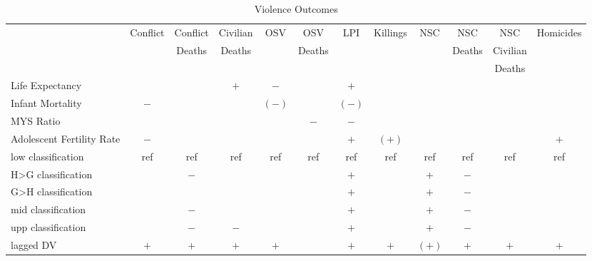 \begin{landscape}
\begin{table}[!htbp]
\centering
\caption{Violence Outcomes}
\label{table_violence}
\begin{tabular}{lccccccccccc}
\toprule
                          & Conflict       & Conflict & Civilian & OSV    & OSV    & LPI    & Killings & NSC      & NSC      & NSC      & Homicides \\
                          &                & Deaths   & Deaths   &        & Deaths &        &          &          & Deaths   & Civilian & \\
                          &                &          &          &        &        &        &          &          &          & Deaths   & \\
\midrule
Life Expectancy           &                &          & $+$      & $-$    &        & $+$    &          &          &          &          & \\
Infant Mortality          & $-$            &          &          & $(-)$  &        & $(-)$  &          &          &          &          & \\
MYS Ratio                 &                &          &          &        & $-$    & $-$    &          &          &          &          & \\
Adolescent Fertility Rate & $-$            &          &          &        &        & $+$    & $(+)$    &          &          &          & $+$ \\
low classification        & ref            & ref      & ref      & ref    & ref    & ref    & ref      & ref      & ref      & ref      & ref \\
H>G classification        &                & $-$      &          &        &        & $+$    &          & $+$      & $-$      &          & \\
G>H classification        &                &          &          &        &        & $+$    &          & $+$      & $-$      &          & \\
mid classification        &                & $-$      &          &        &        & $+$    &          & $+$      & $-$      &          & \\
upp classification        &                & $-$      & $-$      &        &        & $+$    &          & $+$      & $-$      &          & \\
lagged DV                 & $+$            & $+$      & $+$      & $+$    &        & $+$    & $+$      & $(+)$    & $+$      & $+$      & $+$ \\

\end{tabular}
\end{table}
\end{landscape}
